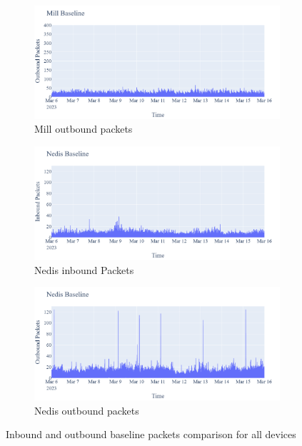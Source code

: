 \begin{figure}[H]
\begin{subfigure}[b]{0.4\textwidth}
    \end{subfigure}
    \begin{subfigure}[b]{0.4\textwidth}
        \includegraphics[width=\textwidth]{figures/Mill_Baseline_outboundPackets.png}
        \caption{Mill outbound packets}
    \end{subfigure}
    \begin{subfigure}[b]{0.4\textwidth}
        \includegraphics[width=\textwidth]{figures/Nedis_Baseline_InboundPackets.png}
        \caption{Nedis inbound Packets}
    \end{subfigure}
    \begin{subfigure}[b]{0.4\textwidth}
        \includegraphics[width=\textwidth]{figures/Nedis_Baseline_OutboundPackets.png}
        \caption{Nedis outbound packets}
    \end{subfigure}
    \caption{Inbound and outbound baseline packets comparison for all devices}
    \label{Fig:CompareBaselineOutandInboundPackets}
 \end{figure}

